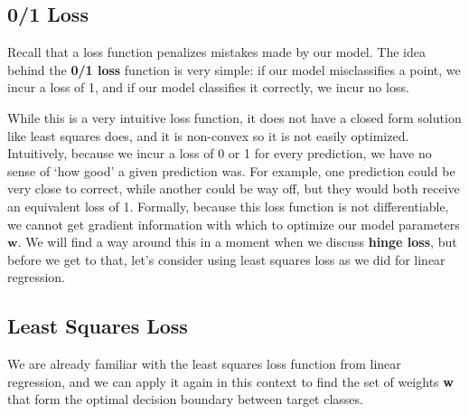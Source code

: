 \subsection{0/1 Loss}
Recall that a loss function penalizes mistakes made by our model. The idea behind the \textbf{0/1 loss} function is very simple: if our model misclassifies a point, we incur a loss of 1, and if our model classifies it correctly, we incur no loss.

While this is a very intuitive loss function, it does not have a closed form solution like least squares does, and it is non-convex so it is not easily optimized. Intuitively, because we incur a loss of 0 or 1 for every prediction, we have no sense of `how good' a given prediction was. For example, one prediction could be very close to correct, while another could be way off, but they would both receive an equivalent loss of 1. Formally, because this loss function is not differentiable, we cannot get gradient information with which to optimize our model parameters $\textbf{w}$. We will find a way around this in a moment when we discuss \textbf{hinge loss}, but before we get to that, let's consider using least squares loss as we did for linear regression.

\subsection{Least Squares Loss}
We are already familiar with the least squares loss function from linear regression, and we can apply it again in this context to find the set of weights \textbf{w} that form the optimal decision boundary between target classes.

